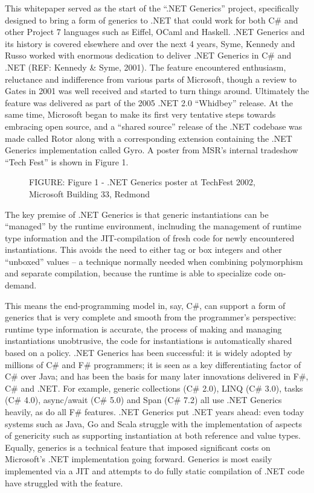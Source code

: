 \documentclass[acmsmall,review]{acmart}\settopmatter{printfolios=true,printccs=false,printacmref=false}
\begin{document}
This whitepaper served as the start of the “.NET Generics” project, specifically designed to bring a form of generics to .NET that could work for both C\# and other Project 7 languages such as Eiffel, OCaml and Haskell.  .NET Generics and its history is covered elsewhere  and over the next 4 years, Syme, Kennedy and Russo worked with enormous dedication to deliver .NET Generics in C\# and .NET (REF: Kennedy \& Syme, 2001). The feature encountered enthusiasm, reluctance and indifference from various parts of Microsoft, though a review to Gates in 2001 was well received and started to turn things around.   Ultimately the feature was delivered as part of the 2005 .NET 2.0 “Whidbey” release.  At the same time, Microsoft began to make its first very tentative steps towards embracing open source, and a “shared source” release of the .NET codebase was made called Rotor along with a corresponding extension containing the .NET Generics implementation called Gyro.  A poster from MSR’s internal tradeshow “Tech Fest” is shown in Figure 1. 

\begin{figure}

FIGURE: Figure 1 - .NET Generics poster at TechFest 2002, Microsoft Building 33, Redmond
\end{figure}

The key premise of .NET Generics is that generic instantiations can be “managed” by the runtime environment, inclnuding the management of runtime type information and the JIT-compilation of fresh code for newly encountered instantiations.  This avoids the need to either tag or box integers and other “unboxed” values – a technique normally needed when combining polymorphism and separate compilation, because the runtime is able to specialize code on-demand.

This means the end-programming model in, say, C\#, can support a form of generics that is very complete and smooth from the programmer’s perspective: runtime type information is accurate, the process of making and managing instantiations unobtrusive, the code for instantiations is automatically shared based on a policy. .NET Generics has been successful: it is widely adopted by millions of C\# and F\# programmers; it is seen as a key differentiating factor of C\# over Java; and has been the basis for many later innovations delivered in F\#, C\# and .NET. For example, generic collections (C\# 2.0), LINQ (C\# 3.0), tasks (C\# 4.0), async/await (C\# 5.0) and Span (C\# 7.2) all use .NET Generics heavily, as do all F\# features.  .NET Generics put .NET years ahead: even today systems such as Java, Go and Scala struggle with the implementation of aspects of genericity such as supporting instantiation at both reference and value types.  Equally, generics is a technical feature that imposed significant costs on Microsoft’s .NET implementation going forward. Generics is most easily implemented via a JIT and attempts to do fully static compilation of .NET code have struggled with the feature.
\end{document}
